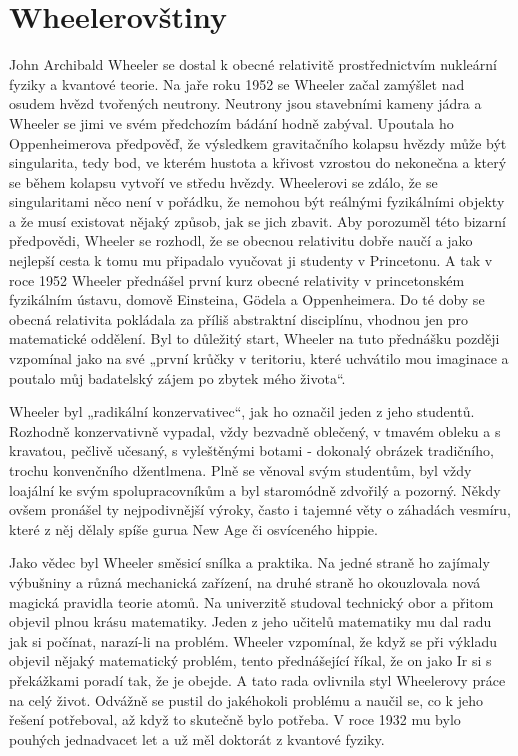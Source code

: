 \section{Wheelerovštiny}\label{feyIchIIIsecVIII} 
  John Archibald Wheeler se dostal k obecné relativitě prostřednictvím nukleární fyziky a kvantové
  teorie. Na jaře roku 1952 se Wheeler začal zamýšlet nad osudem hvězd tvořených neutrony. Neutrony
  jsou stavebními kameny jádra a Wheeler se jimi ve svém předchozím bádání hodně zabýval. Upoutala
  ho Oppenheimerova předpověď, že výsledkem gravitačního kolapsu hvězdy může být singularita, tedy
  bod, ve kterém hustota a křivost vzrostou do nekonečna a který se během kolapsu vytvoří ve středu
  hvězdy. Wheelerovi se zdálo, že se singularitami něco není v pořádku, že nemohou být reálnými
  fyzikálními objekty a že musí existovat nějaký způsob, jak se jich zbavit. Aby porozuměl této
  bizarní předpovědi, Wheeler se rozhodl, že se obecnou relativitu dobře naučí a jako nejlepší cesta
  k tomu mu připadalo vyučovat ji studenty v Princetonu. A tak v roce 1952 Wheeler přednášel první
  kurz obecné relativity v princetonském fyzikálním ústavu, domově Einsteina, Gödela a Oppenheimera.
  Do té doby se obecná relativita pokládala za příliš abstraktní disciplínu, vhodnou jen pro
  matematické oddělení. Byl to důležitý start, Wheeler na tuto přednášku později vzpomínal jako na
  své „první krůčky v teritoriu, které uchvátilo mou imaginace a poutalo můj badatelský zájem po
  zbytek mého života“. 

  Wheeler byl „radikální konzervativec“, jak ho označil jeden z jeho studentů. Rozhodně
  konzervativně vypadal, vždy bezvadně oblečený, v tmavém obleku a s kravatou, pečlivě učesaný, s
  vyleštěnými botami - dokonalý obrázek tradičního, trochu konvenčního džentlmena. Plně se věnoval
  svým studentům, byl vždy loajální ke svým spolupracovníkům a byl staromódně zdvořilý a pozorný.
  Někdy ovšem pronášel ty nejpodivnější výroky, často i tajemné věty o záhadách vesmíru, které z něj
  dělaly spíše gurua New Age či osvíceného hippie. 

  Jako vědec byl Wheeler směsicí snílka a praktika. Na jedné straně ho zajímaly výbušniny a různá
  mechanická zařízení, na druhé straně ho okouzlovala nová magická pravidla teorie atomů. Na
  univerzitě studoval technický obor a přitom objevil plnou krásu matematiky. Jeden z jeho učitelů
  matematiky mu dal radu jak si počínat, narazí-li na problém. Wheeler vzpomínal, že když se při
  výkladu objevil nějaký matematický problém, tento přednášející říkal, že on jako Ir si s
  překážkami poradí tak, že je obejde. A tato rada ovlivnila styl Wheelerovy práce na celý život.
  Odvážně se pustil do jakéhokoli problému a naučil se, co k jeho řešení potřeboval, až když to
  skutečně bylo potřeba. V roce 1932 mu bylo pouhých jednadvacet let a už měl doktorát z kvantové
  fyziky. 


